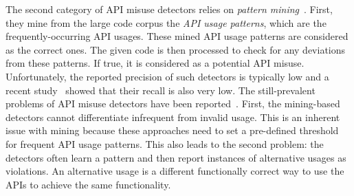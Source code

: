 
%

The second category of API misuse detectors relies on {\em pattern
  mining}~\cite{LZ05,L07,WZL07,RGJ07,NNP+09,AX09,TX09,TX09b,WZ11,MM13,NPVN16}. First,
they mine from the large code corpus the {\em API usage patterns},
which are the frequently-occurring API usages. These mined API usage
patterns are considered as the correct ones. The given code is then
processed to check for any deviations from these patterns.  If true,
it is considered as a potential API misuse. Unfortunately, the
reported precision of such detectors is typically low and a recent
study~\cite{ANNN+17} showed that their recall is also very low.
The still-prevalent problems of API misuse detectors have been
reported~\cite{LHXRM16,ABFKMS16}. First, the mining-based detectors
cannot differentiate infrequent from invalid usage. This is an
inherent issue with mining because these approaches need to set a
pre-defined threshold for frequent API usage patterns. This also leads
to the second problem: the detectors often learn a pattern and then
report instances of alternative usages as violations. An alternative
usage is a different functionally correct way to use the APIs to achieve
the same functionality.


